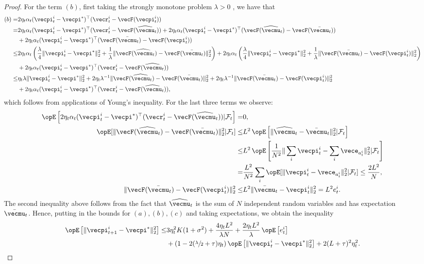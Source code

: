\begin{proof}
For the term $(b)$, first taking the strongly monotone problem $\lambda > 0$ , we have that
\begin{align*}
(b) = & 2\eta_t\alpha_t (\vecpi_t^i - \vecpi^*)^\top (\vecr_t^i - \vecF(\vecpi_t^i)) \\
 = & 2\eta_t\alpha_t (\vecpi_t^i - \vecpi^*)^\top (\vecr_t^i - \vecF(\widehat{\vecmu}_t)) + 2\eta_t\alpha_t (\vecpi_t^i - \vecpi^*)^\top (\vecF(\widehat{\vecmu}_t) - \vecF(\bar{\vecmu}_t)) \\
    & + 2\eta_t\alpha_t (\vecpi_t^i - \vecpi^*)^\top (\vecF(\bar{\vecmu}_t) - \vecF(\vecpi_t^i)) \\
\leq &2\eta_t\alpha_t \left( \frac{\lambda}{4} \|\vecpi_t^i - \vecpi^* \|_2^2 + \frac{1}{\lambda} \|\vecF(\widehat{\vecmu}_t) - \vecF(\bar{\vecmu}_t)\|_2^2\right) + 2\eta_t\alpha_t \left(\frac{\lambda}{4} \|\vecpi_t^i - \vecpi^* \|_2^2 + \frac{1}{\lambda} \|\vecF(\bar{\vecmu}_t) - \vecF(\vecpi_t^i)\|_2^2 \right) \\
    &+2\eta_t\alpha_t (\vecpi_t^i - \vecpi^*)^\top (\vecr_t^i - \vecF(\widehat{\vecmu}_t)) \\
\leq & \eta_t \lambda \|\vecpi_t^i - \vecpi^* \|_2^2 + 2\eta_t\lambda^{-1}\|\vecF(\widehat{\vecmu}_t) - \vecF(\bar{\vecmu}_t)\|_2^2 + 2\eta_t\lambda^{-1} \|\vecF(\bar{\vecmu}_t) - \vecF(\vecpi_t^i)\|_2^2 \\
    &+2\eta_t\alpha_t (\vecpi_t^i - \vecpi^*)^\top (\vecr_t^i - \vecF(\widehat{\vecmu}_t)),
\end{align*}
which follows from applications of Young's inequality.
For the last three terms we observe:
\begin{align*}
    \Exop\left[2\eta_t\alpha_t (\vecpi_t^i - \vecpi^*)^\top (\vecr_t^i - \vecF(\widehat{\vecmu}_t)) | \mathcal{F}_t\right] = &0, \\
    \Exop[\|\vecF(\widehat{\vecmu}_t) - \vecF(\bar{\vecmu}_t)\|_2^2 | \mathcal{F}_{t}] \leq & L^2 \Exop\left[ \|\widehat{\vecmu}_t - \bar{\vecmu}_t\|_2^2 | \mathcal{F}_{t}\right] \\
    \leq & L^2\Exop\left[\frac{1}{N^2}\|\sum_{i}\vecpi_t^i - \sum_{i} \vece_{a_t^i}\|^2_2 | \mathcal{F}_{t}\right] \\
    = & \frac{L^2}{N^2}\sum_{i}\Exop[\|\vecpi_t^i - \vece_{a_t^i}\|^2_2 | \mathcal{F}_{t}] \leq \frac{2L^2}{N}, \\
    \|\vecF(\bar{\vecmu}_t) - \vecF(\vecpi_t^i)\|_2^2 \leq & L^2 \|\bar{\vecmu}_t - \vecpi_t^i\|_2^2 = L^2 e_t^i.
\end{align*}
The second inequality above follows from the fact that $\widehat{\vecmu}_t$ is the sum of $N$ independent random variables and has expectation $\bar{\vecmu}_t$.
Hence, putting in the bounds for $(a), (b), (c)$ and taking expectations, we obtain the inequality
\begin{align*}
    \Exop\left[\| \vecpi_{t+1}^i - \vecpi^*\|_2^2 \right] \leq & 3 \eta_t^2 K(1 + \sigma^2) + \frac{4\eta_t L^2}{\lambda N} + \frac{2\eta_t L^2}{\lambda} \Exop\left[e_t^i\right] \\
        &+\left(1 - 2 (\sfrac{\lambda}{2} + \tau) \eta_t \right) \Exop\left[\| \vecpi_t^i - \vecpi^* \|_2^2\right] + 2(L + \tau)^2 \eta_t^2.
\end{align*}


\end{proof}
